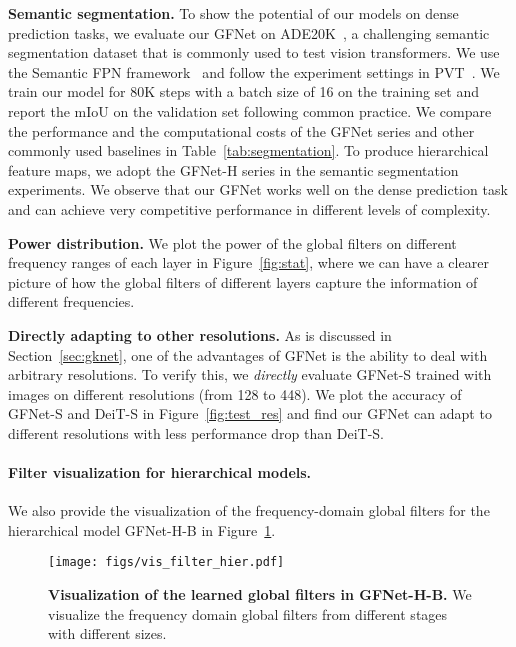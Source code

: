 \documentclass{article}
\numberwithin{equation}{section}
\newcommand{\gknet}{GFNet}
\newcommand{\paragrapha}[2][1pt]{\vspace{#1}\noindent\textbf{#2}}
\begin{document}
\paragrapha{Semantic segmentation.} To show the potential of our models on dense prediction tasks, we evaluate our \gknet{} on ADE20K~\cite{zhou2017scene}, a challenging semantic segmentation dataset that is commonly used to test vision transformers. We use the Semantic FPN framework~\cite{kirillov2019panoptic} and follow the experiment settings in PVT~\cite{wang2021pyramid}. We train our model for 80K steps with a batch size of 16 on the training set and report the mIoU on the validation set following common practice. We compare the performance and the computational costs of the \gknet{} series and other commonly used baselines in Table~\ref{tab:segmentation}. To produce hierarchical feature maps, we adopt the GFNet-H series in the semantic segmentation experiments. We observe that our GFNet works well on the dense prediction task and can achieve very competitive performance in different levels of complexity.

\paragrapha{Power distribution. } We plot the power of the global filters on different frequency ranges of each layer in Figure~\ref{fig:stat}, where we can have a clearer picture of how the global filters of different layers capture the information of different frequencies.


\paragrapha{Directly adapting to other resolutions.} As is discussed in Section~\ref{sec:gknet}, one of the advantages of GFNet is the ability to deal with arbitrary resolutions. To verify this, we \textit{directly} evaluate GFNet-S trained with  images on different resolutions (from 128 to 448). We plot the accuracy of GFNet-S and DeiT-S in Figure~\ref{fig:test_res}  and find our GFNet can adapt to different resolutions with less performance drop than DeiT-S.



\paragraph{Filter visualization for hierarchical models.} We also provide the visualization of the frequency-domain global filters for the  hierarchical model GFNet-H-B in Figure~\ref{fig:vis_hier}. 
\begin{figure}
    \centering
    \texttt{[image: figs/vis\_filter\_hier.pdf]}
    \caption{\textbf{Visualization of the learned global filters in GFNet-H-B.} We visualize the frequency
domain global filters from different stages with different sizes.}
    \label{fig:vis_hier}
\end{figure}
\end{document}
